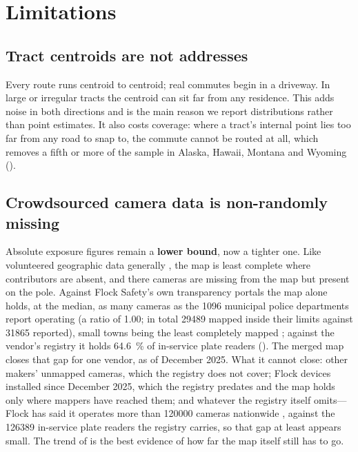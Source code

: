 \documentclass[11pt,twoside]{article}
\begin{document}
\section{Limitations}
\label{sec:limitations}

\subsection{Tract centroids are not addresses}

Every route runs centroid to centroid; real commutes begin in a driveway. In large or
irregular tracts the centroid can sit far from any residence. This adds noise in both
directions and is the main reason we report distributions rather than point estimates. It
also costs coverage: where a tract's internal point lies too far from any road to snap to,
the commute cannot be routed at all, which removes a fifth or more of the sample in Alaska,
Hawaii, Montana and Wyoming ().

\subsection{Crowdsourced camera data is non-randomly missing}
\label{sec:coverage}

Absolute exposure figures remain a \textbf{lower bound}, now a tighter one. Like
volunteered geographic data generally \citep{haklay2010,herfort2023}, the map is least
complete where contributors are absent, and there cameras are missing from the map but
present on the pole. Against Flock Safety's own transparency portals the map alone holds, at
the median, as many cameras as the \num{1096} municipal police departments report operating
(a ratio of \num{1.00}; in total \num{29489} mapped inside their limits against \num{31865}
reported), small towns being the least completely mapped \citep{eyesonflock}; against the vendor's registry it holds
\SI{64.6}{\percent} of in-service plate readers (). The merged map
closes that gap for one vendor, as of December 2025. What it cannot close: other makers'
unmapped cameras, which the registry does not cover; Flock devices installed since December
2025, which the registry predates and the map holds only where mappers have reached them;
and whatever the registry itself omits---Flock has said it operates more than \num{120000}
cameras nationwide \citep{mazurov2026}, against the \num{126389} in-service plate readers
the registry carries, so that gap at least appears small. The trend of
 is the best evidence of how far the map itself still has to go.
\end{document}
